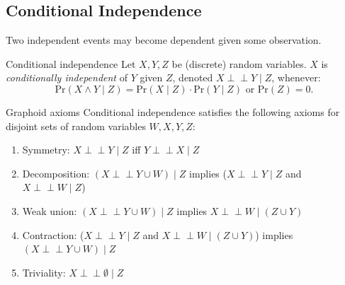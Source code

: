 \documentclass[english]{panikzettel}
\renewcommand{\Pr}{\mathrm{Pr}}
\begin{document}
\subsection{Conditional Independence}

Two independent events may become dependent given some observation.

\begin{defi}{Conditional independence}
	Let $X,Y,Z$ be (discrete) random variables. $X$ is \emph{conditionally independent} of $Y$ given $Z$, denoted $X \perp\!\!\!\!\perp Y \mid Z$, whenever:
	$$\Pr(X \land Y \mid Z)=\Pr(X \mid Z) \cdot \Pr(Y \mid Z) \text{ or } \Pr(Z)=0.$$
\end{defi}

\begin{theo}{Graphoid axioms}
	Conditional independence satisfies the following axioms for disjoint sets of random variables $W,X,Y,Z$:
	\begin{enumerate}
		\item Symmetry: $X \perp\!\!\!\!\perp Y \mid Z$ iff $Y \perp\!\!\!\!\perp X \mid Z$
		\item Decomposition: $(X \perp\!\!\!\!\perp Y \cup W) \mid Z$ implies ($X \perp\!\!\!\!\perp Y \mid Z$ and $X \perp\!\!\!\!\perp W \mid Z$)
		\item Weak union: $(X \perp\!\!\!\!\perp Y \cup  W) \mid Z$ implies $X \perp\!\!\!\!\perp W \mid (Z \cup Y)$
		\item Contraction: ($X \perp\!\!\!\!\perp Y \mid Z$ and  $X \perp\!\!\!\!\perp W \mid (Z \cup Y)$) implies $(X \perp\!\!\!\!\perp Y \cup W) \mid Z$
		\item Triviality: $X \perp\!\!\!\!\perp \emptyset \mid Z$
	\end{enumerate}
\end{theo}
\end{document}
